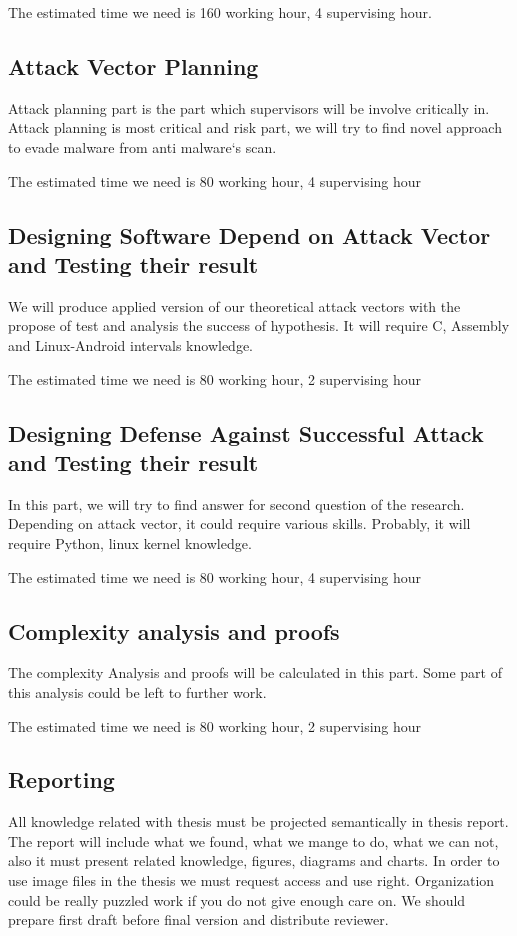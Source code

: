 \documentclass[informationsecurity]{gucmasterproject}
\begin{document}
The estimated time we need is 160 working hour, 4 supervising hour.
\subsection{Attack Vector Planning}
Attack planning part is the part which supervisors will be involve critically in. Attack planning is most critical and risk part, we will try to find novel approach to evade malware from anti malware`s scan. 

The estimated time we need is 80 working hour, 4 supervising hour
\subsection{Designing  Software Depend on Attack Vector and Testing their result}
We will produce applied version of our theoretical attack vectors with the propose of test and analysis the success of hypothesis. It will require C, Assembly and Linux-Android intervals knowledge.

The estimated time we need is 80 working hour, 2 supervising hour 
\subsection{Designing  Defense Against Successful Attack and Testing their result}
In this part, we will try to find answer for second question of the research. Depending on attack vector, it could require various skills. Probably, it will require Python, linux kernel knowledge.

The estimated time we need is 80 working hour, 4 supervising hour 
\subsection{Complexity analysis and proofs}
The complexity Analysis and proofs will be calculated in this part. Some part of this analysis could be left to further work. 

The estimated time we need is 80 working hour, 2 supervising hour 

\subsection{Reporting}
All knowledge related with thesis must be projected semantically in thesis report. The report will include what we found, what we mange to do, what we can not, also it must present related knowledge, figures, diagrams and charts. In order to use image files in the thesis we must request access and use right. Organization could be really puzzled work if you do not give enough care on. We should prepare first draft before final version and distribute reviewer.  
\end{document}
